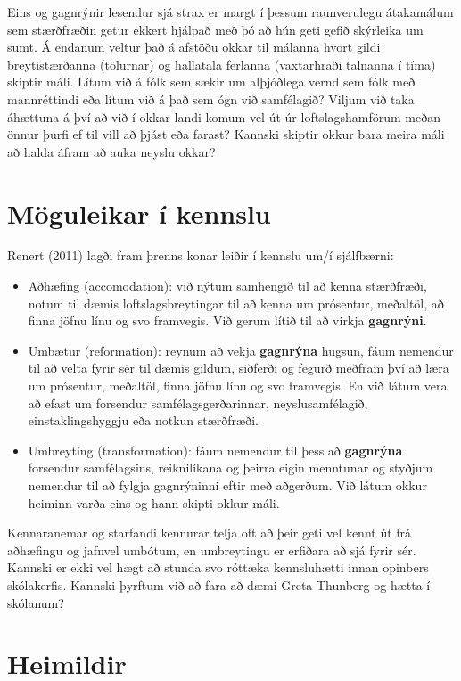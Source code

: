 \documentclass[
  icelandic,
]{book}
\providecommand{\tightlist}{%
  \setlength{\itemsep}{0pt}\setlength{\parskip}{0pt}}
\begin{document}
Eins og gagnrýnir lesendur sjá strax er margt í þessum raunverulegu átakamálum sem stærðfræðin getur ekkert hjálpað með þó að hún geti gefið skýrleika um sumt. Á endanum veltur það á afstöðu okkar til málanna hvort gildi breytistærðanna (tölurnar) og hallatala ferlanna (vaxtarhraði talnanna í tíma) skiptir máli. Lítum við á fólk sem sækir um alþjóðlega vernd sem fólk með mannréttindi eða lítum við á það sem ógn við samfélagið? Viljum við taka áhættuna á því að við í okkar landi komum vel út úr loftslagshamförum meðan önnur þurfi ef til vill að þjást eða farast? Kannski skiptir okkur bara meira máli að halda áfram að auka neyslu okkar?

\section{Möguleikar í kennslu}\label{moguleikar_kennslu}

Renert (2011) lagði fram þrenns konar leiðir í kennslu um/í sjálfbærni:

\begin{itemize}
\tightlist
\item
  Aðhæﬁng (accomodation): við nýtum samhengið til að kenna stærðfræði, notum til dæmis loftslagsbreytingar til að kenna um prósentur, meðaltöl, að finna jöfnu línu og svo framvegis. Við gerum lítið til að virkja \textbf{gagnrýni}.
\item
  Umbætur (reformation): reynum að vekja \textbf{gagnrýna} hugsun, fáum nemendur til að velta fyrir sér til dæmis gildum, siðferði og fegurð meðfram því að læra um prósentur, meðaltöl, finna jöfnu línu og svo framvegis. En við látum vera að efast um forsendur samfélagsgerðarinnar, neyslusamfélagið, einstaklingshyggju eða notkun stærðfræði.
\item
  Umbreyting (transformation): fáum nemendur til þess að \textbf{gagnrýna} forsendur samfélagsins, reiknilíkana og þeirra eigin menntunar og styðjum nemendur til að fylgja gagnrýninni eftir með aðgerðum. Við látum okkur heiminn varða eins og hann skipti okkur máli.
\end{itemize}

Kennaranemar og starfandi kennurar telja oft að þeir geti vel kennt út frá aðhæfingu og jafnvel umbótum, en umbreytingu er erfiðara að sjá fyrir sér. Kannski er ekki vel hægt að stunda svo róttæka kennsluhætti innan opinbers skólakerfis. Kannski þyrftum við að fara að dæmi Greta Thunberg og hætta í skólanum?

\section{Heimildir}\label{gagnryni_heimildir}
\end{document}
